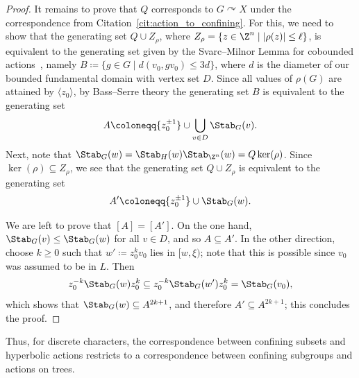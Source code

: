 \begin{proof}
It remains to prove that $Q$ corresponds to $G\curvearrowright X$ under the correspondence from Citation~\ref{cit:action_to_confining}. For this, we need to show that the generating set $Q \cup Z_\rho$, where $Z_\rho = \{ z \in \Z^n \mid |\rho(z)| \leq \ell \}$, is equivalent to the generating set given by the Svarc--Milnor Lemma for cobounded actions~\cite[Lemma 3.11]{ABO}, namely $B \coloneqq \{ g \in G \mid d(v_0, gv_0) \leq 3d \}$, where $d$ is the diameter of our bounded fundamental domain with vertex set $D$. Since all values of $\rho(G)$ are attained by $\langle z_0 \rangle$, by Bass--Serre theory the generating set $B$ is equivalent to the generating set
\[A \coloneqq \{ z_0^{\pm 1} \} \cup \bigcup_{v\in D} \Stab_G(v).\]
Next, note that $\Stab_G(w) = \Stab_H(w) \Stab_{\Z^n}(w) = Q \ker(\rho)$. Since $\ker(\rho) \subseteq Z_\rho$, we see that the generating set $Q \cup Z_\rho$ is equivalent to the generating set
\[A' \coloneqq \{z_0^{\pm 1}\}\cup \Stab_G(w).\]

We are left to prove that $[A] = [A']$. On the one hand, $\Stab_G(v) \leq \Stab_G(w)$ for all $v\in D$, and so $A \subseteq A'$. In the other direction, choose $k \geq 0$ such that $w' \coloneqq z_0^k v_0$ lies in $[w,\xi)$; note that this is possible since $v_0$ was assumed to be in $L$. Then
\[z_0^{-k} \Stab_G(w) z_0^k \subseteq z_0^{-k} \Stab_G(w') z_0^k = \Stab_G(v_0),\]
which shows that $\Stab_G(w) \subseteq A^{2k+1}$, and therefore $A' \subseteq A^{2k+1}$; this concludes the proof.
\end{proof}

Thus, for discrete characters, the correspondence between confining subsets and hyperbolic actions restricts to a correspondence between confining subgroups and actions on trees.

